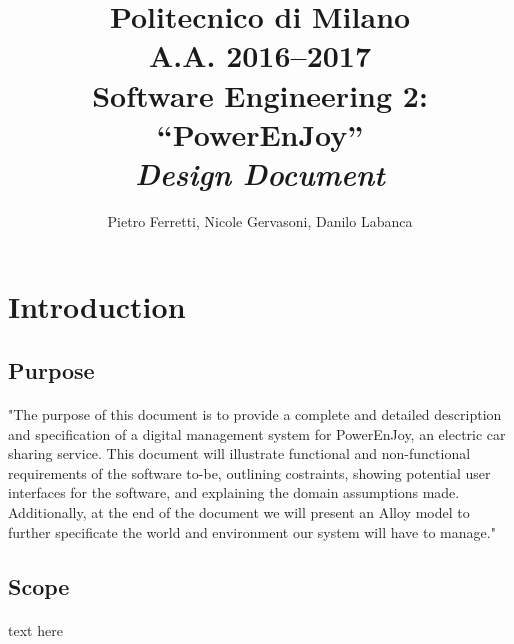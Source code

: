 \documentclass[english]{article}
\begin{document}
\title{Politecnico di Milano\\
 A.A. 2016–2017 \\
Software Engineering 2: “PowerEnJoy” \\
\emph{Design Document}}

\author{Pietro Ferretti, Nicole Gervasoni, Danilo Labanca}
\maketitle

\newpage

\tableofcontents{}

\newpage

\section{Introduction}

\subsection{Purpose}

\paragraph{}
"The purpose of this document is to provide a complete and detailed description and specification of a digital management system for PowerEnJoy, an electric car sharing service. This document will
illustrate functional and non-functional requirements of the software to-be, outlining costraints, showing potential user interfaces for the software, and explaining the domain assumptions made. Additionally, at the end of the document we will present an Alloy model to further specificate the world and environment our system will have to manage."




\subsection{Scope}


\paragraph{}
text here
\end{document}
